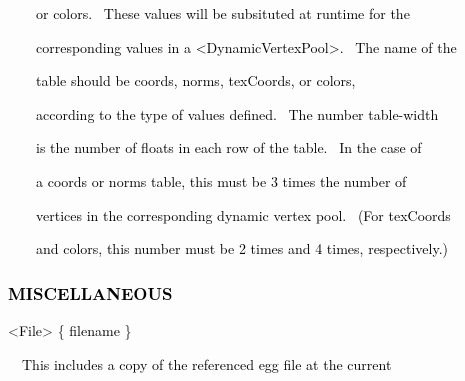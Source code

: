 \documentclass[a4paper]{article}
\newcommand\textstyleOOoComputerKeyWord[1]{\textrm{\textcolor[rgb]{0.0,0.0,0.5019608}{#1}}}
\newcommand\textstyleOOoAssemblerSpecialChar[1]{\textrm{\textcolor[rgb]{0.0,0.5019608,0.0}{#1}}}
\newcommand\textstyleOOoAssemblerIdent[1]{\textrm{\textcolor{black}{#1}}}
\begin{document}
{\color{black}
\textstyleOOoComputerKeyWord{\textcolor{black}{\ \ \ \ or colors. \ These values will be subsituted at runtime for
the}}}

{\color{black}
\textstyleOOoComputerKeyWord{\textcolor{black}{\ \ \ \ corresponding values in a
{\textless}DynamicVertexPool{\textgreater}. \ The name of the}}}

{\color{black}
\textstyleOOoComputerKeyWord{\textcolor{black}{\ \ \ \ table should be {\textquotedbl}coords{\textquotedbl},
{\textquotedbl}norms{\textquotedbl}, {\textquotedbl}texCoords{\textquotedbl}, or
{\textquotedbl}colors{\textquotedbl},}}}

{\color{black}
\textstyleOOoComputerKeyWord{\textcolor{black}{\ \ \ \ according to the type of values defined. \ The number
table-width}}}

{\color{black}
\textstyleOOoComputerKeyWord{\textcolor{black}{\ \ \ \ is the number of floats in each row of the table. \ In the case
of}}}

{\color{black}
\textstyleOOoComputerKeyWord{\textcolor{black}{\ \ \ \ a coords or norms table, this must be 3 times the number of}}}

{\color{black}
\textstyleOOoComputerKeyWord{\textcolor{black}{\ \ \ \ vertices in the corresponding dynamic vertex pool. \ (For
texCoords}}}

{\color{black}
\textstyleOOoComputerKeyWord{\textcolor{black}{\ \ \ \ and colors, this number must be 2 times and 4 times,
respectively.)}}}


\bigskip


\bigskip


\bigskip

\subsubsection[MISCELLANEOUS]{\textstyleOOoComputerKeyWord{\textcolor{black}{MISCELLANEOUS}}}
\hypertarget{RefHeading7724869075401}{}
\bigskip

{\color{black}
\textstyleOOoAssemblerSpecialChar{{\textless}}\textstyleOOoAssemblerIdent{File}\textstyleOOoAssemblerSpecialChar{{\textgreater}}\textstyleOOoComputerKeyWord{\textcolor{black}{
}}\textstyleOOoAssemblerSpecialChar{\{}\textstyleOOoComputerKeyWord{\textcolor{black}{
}}\textstyleOOoAssemblerIdent{filename}\textstyleOOoComputerKeyWord{\textcolor{black}{
}}\textstyleOOoAssemblerSpecialChar{\}}}


\bigskip

{\color{black}
\textstyleOOoComputerKeyWord{\textcolor{black}{\ \ This includes a copy of the referenced egg file at the current}}}
\end{document}

